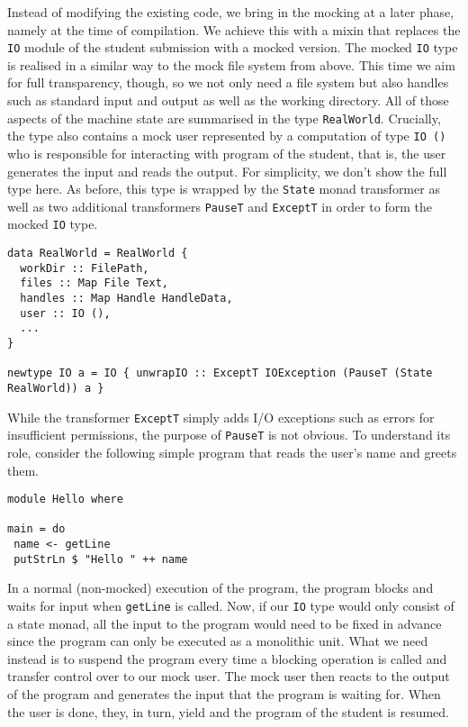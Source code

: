 Instead of modifying the existing code, we bring in the mocking at a later phase, namely at the time of compilation.
We achieve this with a mixin that replaces the \texttt{IO} module of the student submission with a mocked version.
The mocked \texttt{IO} type is realised in a similar way to the mock file system from above.
This time we aim for full transparency, though, so we not only need a file system but also handles such as standard input and output as well as the working directory.
All of those aspects of the machine state are summarised in the type \texttt{RealWorld}.
Crucially, the type also contains a mock user represented by a computation of type \texttt{IO ()} who is responsible for interacting with program of the student, that is, the user generates the input and reads the output.
For simplicity, we don't show the full type here.
As before, this type is wrapped by the \texttt{State} monad transformer as well as two additional transformers \texttt{PauseT} and \texttt{ExceptT} in order to form the mocked \texttt{IO} type.
\begin{verbatim}
data RealWorld = RealWorld {
  workDir :: FilePath,
  files :: Map File Text,
  handles :: Map Handle HandleData,
  user :: IO (),
  ...
}

newtype IO a = IO { unwrapIO :: ExceptT IOException (PauseT (State RealWorld)) a } 
\end{verbatim}
While the transformer \texttt{ExceptT} simply adds I/O exceptions such as errors for insufficient permissions, the purpose of \texttt{PauseT} is not obvious.
To understand its role, consider the following simple program that reads the user's name and greets them.
\begin{verbatim}
module Hello where

main = do
 name <- getLine
 putStrLn $ "Hello " ++ name
\end{verbatim}
In a normal (non-mocked) execution of the program, the program blocks and waits for input when \texttt{getLine} is called.
Now, if our \texttt{IO} type would only consist of a state monad, all the input to the program would need to be fixed in advance since the program can only be executed as a monolithic unit.
What we need instead is to suspend the program every time a blocking operation is called and transfer control over to our mock user.
The mock user then reacts to the output of the program and generates the input that the program is waiting for.
When the user is done, they, in turn, yield and the program of the student is resumed.


